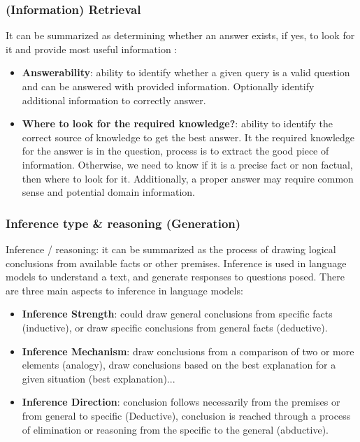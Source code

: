 \documentclass[acmsmall]{acmart}
\begin{document}
\subsubsection{(Information) \textbf{Retrieval}}
It can be summarized as determining whether an answer exists, if yes, to look for it and provide most useful information :
\begin{itemize}
    \item \textbf{Answerability}: ability to identify whether a given query is a valid question and can be answered with provided information.  Optionally identify additional information to correctly answer.
    \item \textbf{Where to look for the required knowledge?}: ability to identify the correct source of knowledge to get the best answer.  It the required knowledge for the answer is in the question, process is to extract the good piece of information. Otherwise, we need to know if it is a precise fact or non factual, then where to look for it. Additionally, a proper answer may require common sense and potential domain information.
\end{itemize}

\subsubsection{\textbf{Inference type \& reasoning} (Generation)}
Inference / reasoning:  it can be summarized as the process of drawing logical conclusions from available facts or other premises. Inference is used in language models to understand a text, and generate responses to questions posed. There are three main aspects to inference in language models:
\begin{itemize}
    \item \textbf{Inference Strength}: could draw general conclusions from specific facts (inductive), or draw specific conclusions from general facts (deductive).
    \item \textbf{Inference Mechanism}: draw conclusions from a comparison of two or more elements (analogy), draw conclusions based on the best explanation for a given situation (best explanation)...
    \item \textbf{Inference Direction}: conclusion follows necessarily from the premises or from general to specific (Deductive), conclusion is reached through a process of elimination or reasoning from the specific to the general (abductive).
\end{itemize}
\end{document}

